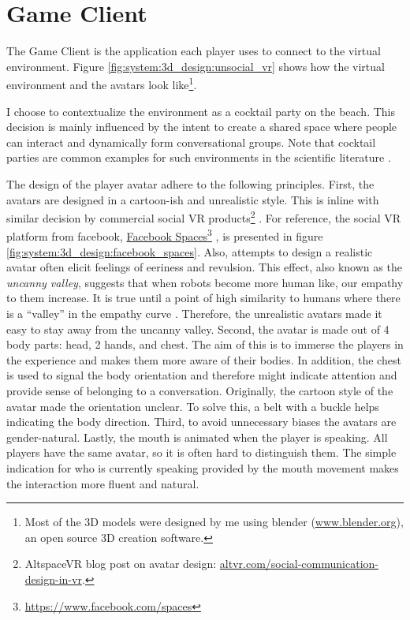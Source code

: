 \documentclass[]{simple-thesis}
\newcommand\fnurl[2]{%
  \href{#2}{#1}\footnote{\url{#2}}%
}
\begin{document}
\section{Game Client}

The Game Client is the application each player uses to connect to the virtual environment.
Figure \ref{fig:system:3d_design:unsocial_vr} shows how the virtual environment and the avatars look like\footnote{Most of the 3D models were designed by me using blender (\href{https://www.blender.org/}{www.blender.org}), an open source 3D creation software.}.

I choose to contextualize the environment as a cocktail party on the beach.
This decision is mainly influenced by the intent to create a shared space where people can interact and dynamically form conversational groups.
Note that cocktail parties are common examples for such environments in the scientific literature \citep{Setti2015}.

The design of the player avatar adhere to the following principles.
First, the avatars are designed in a cartoon-ish and unrealistic style.
This is inline with similar decision by commercial social VR products\footnote{AltspaceVR blog post on avatar design: \href{https://altvr.com/social-communication-design-in-vr/}{altvr.com/social-communication-design-in-vr}.} \citep{Ghosh2017, Pot2016}.
For reference, the social VR platform from facebook, \fnurl{Facebook Spaces}{https://www.facebook.com/spaces}, is presented in figure \ref{fig:system:3d_design:facebook_spaces}.
Also, attempts to design a realistic avatar often elicit feelings of eeriness and revulsion.
This effect, also known as the \textit{uncanny valley}, suggests that when robots become more human like, our empathy to them increase.
It is true until a point of high similarity to humans where there is a ``valley'' in the empathy curve \citep{Mori1970}.
Therefore, the unrealistic avatars made it easy to stay away from the uncanny valley.
Second, the avatar is made out of 4 body parts: head, 2 hands, and chest.
The aim of this is to immerse the players in the experience and makes them more aware of their bodies.
In addition, the chest is used to signal the body orientation and therefore might indicate attention and provide sense of belonging to a conversation.
Originally, the cartoon style of the avatar made the orientation unclear.
To solve this, a belt with a buckle helps indicating the body direction.
Third, to avoid unnecessary biases the avatars are gender-natural.
Lastly, the mouth is animated when the player is speaking.
All players have the same avatar, so it is often hard to distinguish them.
The simple indication for who is currently speaking provided by the mouth movement makes the interaction more fluent and natural.
\end{document}
